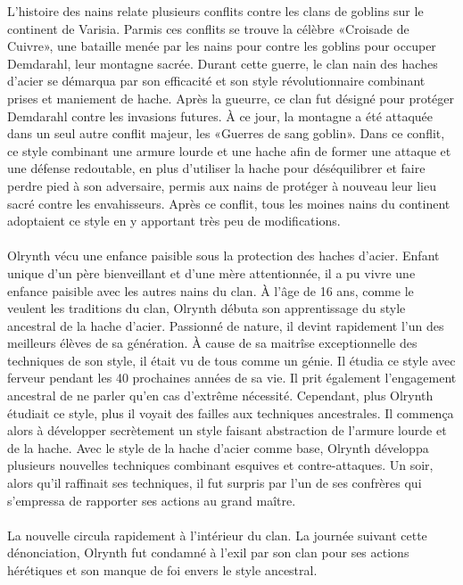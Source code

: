 \documentclass[main.tex]{subfiles}
\begin{document}
    L'histoire des nains relate plusieurs conflits contre les clans de goblins sur le continent de Varisia.
    Parmis ces conflits se trouve la célèbre «Croisade de Cuivre», une bataille menée par les nains pour contre
    les goblins pour occuper Demdarahl, leur montagne sacrée. Durant cette guerre, le clan nain des haches 
    d'acier se démarqua par son efficacité et son style révolutionnaire combinant prises et maniement de hache.
    Après la gueurre, ce clan fut désigné pour protéger Demdarahl contre les invasions futures. À ce jour, la 
    montagne a été attaquée dans un seul autre conflit majeur, les «Guerres de sang goblin». Dans ce conflit, 
    ce style combinant une armure lourde et une hache afin de former une attaque et une défense redoutable, 
    en plus d'utiliser la hache pour déséquilibrer et faire perdre pied à son adversaire, permis aux nains de 
    protéger à nouveau leur lieu sacré contre les envahisseurs. Après ce conflit, tous les moines nains du 
    continent adoptaient ce style en y apportant très peu de modifications. \\
    \\
    Olrynth vécu une enfance paisible sous la protection des haches d'acier.
    Enfant unique d'un père bienveillant et d'une mère attentionnée, il a pu vivre une enfance paisible avec
    les autres nains du clan. À l'âge de 16 ans, comme le veulent les traditions du clan, Olrynth débuta son
    apprentissage du style ancestral de la hache d'acier. Passionné de nature, il devint rapidement l'un des
    meilleurs élèves de sa génération. À cause de sa maitrîse exceptionnelle des techniques de son style, il
    était vu de tous comme un génie. Il étudia ce style avec ferveur pendant les 40 prochaines années de sa vie.
    Il prit également l'engagement ancestral de ne parler qu'en cas d'extrême nécessité.
    Cependant, plus Olrynth étudiait ce style, plus il voyait des failles aux techniques ancestrales. 
    Il commença alors à développer secrètement un style faisant abstraction de l'armure lourde et de la hache. 
    Avec le style de la hache d'acier comme base, Olrynth développa plusieurs nouvelles techniques combinant 
    esquives et contre-attaques. Un soir, alors qu'il raffinait ses techniques, il fut surpris par l'un de ses 
    confrères qui s'empressa de rapporter ses actions au grand maître.\\
    \\
    La nouvelle circula rapidement à l'intérieur du clan. La journée suivant cette dénonciation, Olrynth fut
    condamné à l'exil par son clan pour ses actions hérétiques et son manque de foi envers le style ancestral.
\end{document}
